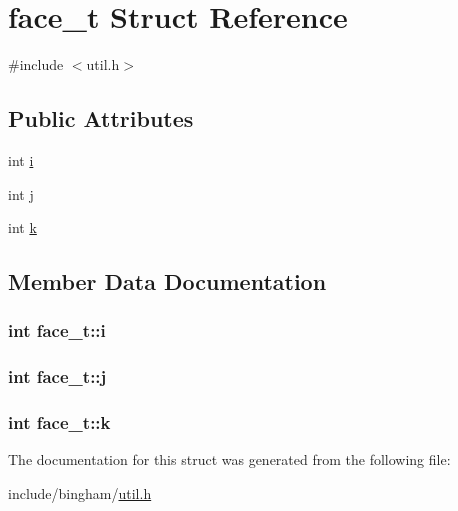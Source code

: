 \hypertarget{structface__t}{
\section{face\_\-t Struct Reference}
\label{structface__t}
}


{\ttfamily \#include $<$util.h$>$}

\subsection*{Public Attributes}
\begin{DoxyCompactItemize}
\item 
int \hyperlink{structface__t_a37132ed8e9215874d0670d44a634adce}{i}
\item 
int \hyperlink{structface__t_a6ac38b84c67e37f5e904b9c7a46be14c}{j}
\item 
int \hyperlink{structface__t_a6eae47aeb38ff23448acb653550d07dd}{k}
\end{DoxyCompactItemize}


\subsection{Member Data Documentation}
\hypertarget{structface__t_a37132ed8e9215874d0670d44a634adce}{
\subsubsection[{i}]{\setlength{\rightskip}{0pt plus 5cm}int {\bf face\_\-t::i}}}
\label{structface__t_a37132ed8e9215874d0670d44a634adce}
\hypertarget{structface__t_a6ac38b84c67e37f5e904b9c7a46be14c}{
\subsubsection[{j}]{\setlength{\rightskip}{0pt plus 5cm}int {\bf face\_\-t::j}}}
\label{structface__t_a6ac38b84c67e37f5e904b9c7a46be14c}
\hypertarget{structface__t_a6eae47aeb38ff23448acb653550d07dd}{
\subsubsection[{k}]{\setlength{\rightskip}{0pt plus 5cm}int {\bf face\_\-t::k}}}
\label{structface__t_a6eae47aeb38ff23448acb653550d07dd}


The documentation for this struct was generated from the following file:\begin{DoxyCompactItemize}
\item 
include/bingham/\hyperlink{util_8h}{util.h}\end{DoxyCompactItemize}
